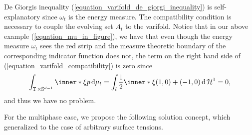 De Giorgis inequality (\ref{equation_varifold_de_giorgi_inequality}) is 
self-explanatory since $ \omega_{ t } $ is the energy measure. The 
compatibility condition is necessary to couple the evolving set $ A_{ t } $ to 
the varifold. Notice that in our above example (\ref{equation_mu_in_figure}), 
we have that even though the energy measure $ \omega_{ t } $ sees the red strip 
and the measure theoretic boundary of the corresponding indicator function does 
not, the term on the right hand side of (\ref{equation_varifold_compatibility}) 
is zero since
\begin{equation*}
	\int_{ \flattorus \times \mathbb{ S }^{ d - 1 } }
		\inner*{ \xi }{ p }
	\dd{ \mu_{ t } }
	=
	\int_{ l }
		\frac{ 1 }{ 2 }
		\inner*{ \xi }{ ( 1 , 0 ) + ( - 1 , 0 ) }
	\dd{ \hm^{ 1 } }
	= 
	0,
\end{equation*} 
and thus we have no problem.

For the multiphase case, we propose the following solution concept, which 
generalized 
\cite[Def.~2]{hensel_laux_varifold_solution_concept_for_mean_curvature_flow} to 
the case of arbitrary surface tensions.

